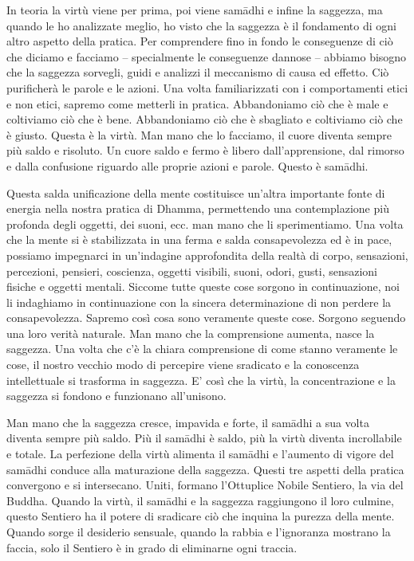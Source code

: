 In teoria la virtù viene per prima, poi viene samādhi e infine la
saggezza, ma quando le ho analizzate meglio, ho visto che la saggezza è
il fondamento di ogni altro aspetto della pratica. Per comprendere fino
in fondo le conseguenze di ciò che diciamo e facciamo -- specialmente le
conseguenze dannose -- abbiamo bisogno che la saggezza sorvegli, guidi e
analizzi il meccanismo di causa ed effetto. Ciò purificherà le parole e
le azioni. Una volta familiarizzati con i comportamenti etici e non
etici, sapremo come metterli in pratica. Abbandoniamo ciò che è male e
coltiviamo ciò che è bene. Abbandoniamo ciò che è sbagliato e coltiviamo
ciò che è giusto. Questa è la virtù. Man mano che lo facciamo, il cuore
diventa sempre più saldo e risoluto. Un cuore saldo e fermo è libero
dall'apprensione, dal rimorso e dalla confusione riguardo alle proprie
azioni e parole. Questo è samādhi.

Questa salda unificazione della mente costituisce un'altra importante
fonte di energia nella nostra pratica di Dhamma, permettendo una
contemplazione più profonda degli oggetti, dei suoni, ecc. man mano che
li sperimentiamo. Una volta che la mente si è stabilizzata in una ferma
e salda consapevolezza ed è in pace, possiamo impegnarci in un'indagine
approfondita della realtà di corpo, sensazioni, percezioni, pensieri,
coscienza, oggetti visibili, suoni, odori, gusti, sensazioni fisiche e
oggetti mentali. Siccome tutte queste cose sorgono in continuazione, noi
li indaghiamo in continuazione con la sincera determinazione di non
perdere la consapevolezza. Sapremo così cosa sono veramente queste cose.
Sorgono seguendo una loro verità naturale. Man mano che la comprensione
aumenta, nasce la saggezza. Una volta che c'è la chiara comprensione di
come stanno veramente le cose, il nostro vecchio modo di percepire viene
sradicato e la conoscenza intellettuale si trasforma in saggezza. E'
così che la virtù, la concentrazione e la saggezza si fondono e
funzionano all'unisono.

Man mano che la saggezza cresce, impavida e forte, il samādhi a sua
volta diventa sempre più saldo. Più il samādhi è saldo, più la virtù
diventa incrollabile e totale. La perfezione della virtù alimenta il
samādhi e l'aumento di vigore del samādhi conduce alla maturazione della
saggezza. Questi tre aspetti della pratica convergono e si intersecano.
Uniti, formano l'Ottuplice Nobile Sentiero, la via del Buddha. Quando la
virtù, il samādhi e la saggezza raggiungono il loro culmine, questo
Sentiero ha il potere di sradicare ciò che inquina la purezza della
mente.%
Quando sorge il desiderio sensuale, quando la
rabbia e l'ignoranza mostrano la faccia, solo il Sentiero è in grado di
eliminarne ogni traccia.

